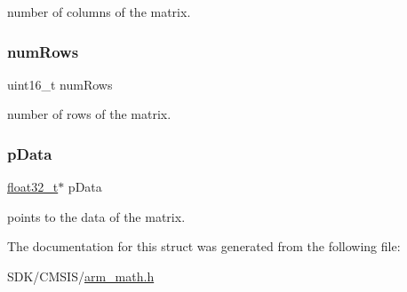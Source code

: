 number of columns of the matrix. \mbox{\label{structarm__matrix__instance__f32_a1bcf80ccdc2acc29198f1592ae300390}} 
\subsubsection{\texorpdfstring{num\+Rows}{numRows}}
{\footnotesize\ttfamily uint16\+\_\+t num\+Rows}

number of rows of the matrix. \mbox{\label{structarm__matrix__instance__f32_af5c3a2f15c98850cdcfbe6f87e5ac5df}} 
\subsubsection{\texorpdfstring{p\+Data}{pData}}
{\footnotesize\ttfamily \mbox{\hyperlink{arm__math_8h_a4611b605e45ab401f02cab15c5e38715}{float32\+\_\+t}}$\ast$ p\+Data}

points to the data of the matrix. 

The documentation for this struct was generated from the following file\+:\begin{DoxyCompactItemize}
\item 
S\+D\+K/\+C\+M\+S\+I\+S/\mbox{\hyperlink{arm__math_8h}{arm\+\_\+math.\+h}}\end{DoxyCompactItemize}
